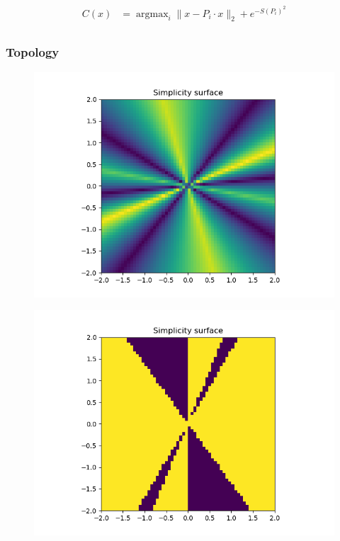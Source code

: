 \begin{align*}
C(x) &= \mathop{\text{argmax}}_i  \parallel x-P_i\cdot x\parallel_2 + e^{-S(P_i)^2}\\
\end{align*}

\subsubsection{Topology}

\begin{figure}[h!]
\centering
\includegraphics[width=1\textwidth,height=0.5\textheight]{../../pictures/figures/complexity_surface_nd-3d.png}
\caption{}
\end{figure}

\begin{figure}[h!]
\centering
\includegraphics[width=1\textwidth,height=0.5\textheight]{../../pictures/figures/complexity_surface_nd-4d-S-0.png}
\caption{}
\end{figure}

